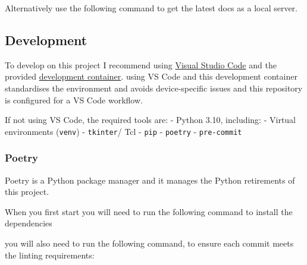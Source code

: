 Alternatively use the following command to get the latest docs as a
local server.

\begin{Shaded}
\begin{Highlighting}[]
\end{Highlighting}
\end{Shaded}

\hypertarget{development}{%
\subsection{Development}\label{development}}

To develop on this project I recommend using
\href{https://code.visualstudio.com/download}{Visual Studio Code} and
the provided
\href{https://code.visualstudio.com/docs/devcontainers/containers}{development
container}. using VS Code and this development container standardises
the environment and avoids device-specific issues and this repository is
configured for a VS Code workflow.

If not using VS Code, the required tools are: - Python 3.10, including:
- Virtual environments (\texttt{venv}) - \texttt{tkinter}/ Tcl -
\texttt{pip} - \texttt{poetry} - \texttt{pre-commit}

\hypertarget{poetry}{%
\subsubsection{Poetry}\label{poetry}}

Poetry is a Python package manager and it manages the Python retirements
of this project.

When you first start you will need to run the following command to
install the dependencies

\begin{Shaded}
\begin{Highlighting}[]
\end{Highlighting}
\end{Shaded}

you will also need to run the following command, to ensure each commit
meets the linting requirements:

\begin{Shaded}
\begin{Highlighting}[]
\end{Highlighting}
\end{Shaded}

